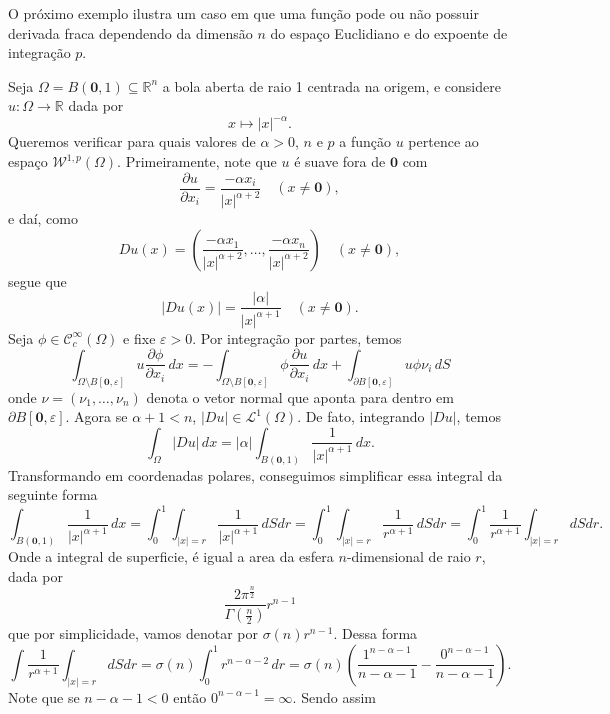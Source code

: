 \documentclass[a4paper, 11pt]{book}
\theoremstyle{definition}
\newcommand{\bR}{\mathbb{R}}
\newcommand{\cC}{\mathcal{C}}
\newcommand{\cL}{\mathcal{L}}
\newcommand{\cW}{\mathcal{W}}
\begin{document}
O próximo exemplo ilustra um caso em que uma função pode ou não possuir derivada fraca dependendo da dimensão $n$ do espaço Euclidiano e do expoente de integração $p$.

\begin{ex}
    Seja $\Omega = B(\mathbf{0},1) \subseteq \bR^n$ a bola aberta de raio 1 centrada na origem, e considere $u : \Omega \to \bR$ dada por
    \[
        x \mapsto |x|^{-\alpha}.
    \]
    Queremos verificar para quais valores de $\alpha > 0$, $n$ e $p$ a função $u$ pertence ao espaço $\cW^{1,p}(\Omega)$.
    Primeiramente, note que $u$ é suave fora de $\mathbf{0}$ com
    \[
        \dfrac{\partial u}{\partial x_i} = \frac{-\alpha x_i}{|x|^{\alpha + 2}} \quad (x \neq \mathbf{0}),
    \]
    e daí, como
    \[
        Du(x) = \left(\frac{-\alpha x_1}{|x|^{\alpha + 2}},\dots,\frac{-\alpha x_n}{|x|^{\alpha + 2}}  \right) \quad (x \neq \mathbf{0}),
    \]
    segue que
    \[
        |Du(x)| = \frac{|\alpha|}{|x|^{\alpha + 1}} \quad (x \neq \mathbf{0}).
    \]
    Seja $\phi \in \cC^\infty_c(\Omega)$ e fixe $\varepsilon > 0$. Por integração por partes, temos
    \[
        \int_{\Omega \setminus B[\mathbf{0}, \varepsilon]} u \dfrac{\partial \phi}{\partial x_i} \, dx = -\int_{\Omega \setminus B[\mathbf{0}, \varepsilon]} \phi \dfrac{\partial u}{\partial x_i} \,dx + \int_{\partial B[\mathbf{0},\varepsilon]} u \phi \nu_i \,dS
    \]
    onde $\nu = (\nu_1,\dots,\nu_n)$ denota o vetor normal que aponta para dentro em $\partial B[\mathbf{0},\varepsilon]$.
    Agora se $\alpha + 1 < n$, $|Du| \in \cL^1(\Omega)$.
    De fato, integrando $|Du|$, temos
    \[
        \int_\Omega |Du| \,dx = |\alpha|\int_{B(\mathbf{0},1)} \frac{1}{|x|^{\alpha+1}} \,dx.
    \]
    Transformando em coordenadas polares, conseguimos simplificar essa integral da seguinte forma
    \[
        \int_{B(\mathbf{0},1)} \frac{1}{|x|^{\alpha+1}} \,dx =  \int_0^1 \int_{|x| = r} \frac{1}{|x|^{\alpha + 1}} \,dS dr = \int_0^1 \int_{|x|= r} \frac{1}{r^{\alpha + 1}} \, dS dr = \int_0^1 \frac{1}{r^{\alpha+1}}  \int_{|x| = r} dS dr.
    \]
    Onde a integral de superficie, é igual a area da esfera $n$-dimensional de raio $r$, dada por
    \[
        \frac{2\pi^{\frac{n}{2}}}{\Gamma(\frac{n}{2})}r^{n-1}
    \]
    que por simplicidade, vamos denotar por $\sigma(n) r^{n-1}$. Dessa forma
    \[
        \int \frac{1}{r^{\alpha+1}}  \int_{|x| = r} dS dr = \sigma(n)\int_0^1 r^{n-\alpha-2} \,dr = \sigma(n)\left(\frac{1^{n-\alpha-1}}{n-\alpha -1} - \frac{0^{n-\alpha-1}}{n-\alpha-1}\right).
    \]
    Note que se $n - \alpha - 1 < 0$ então $0^{n-\alpha-1} = \infty$. Sendo assim

\end{ex}
\end{document}
